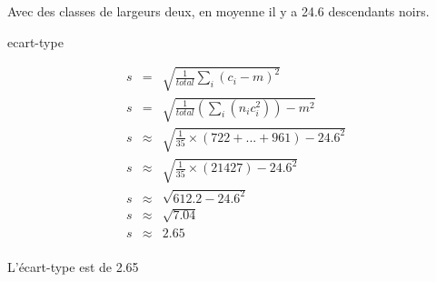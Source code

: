 \documentclass[11pt]{article}
\begin{document}
\begin{enumerate}
  Avec des classes de largeurs deux, en moyenne il y a 24.6 descendants noirs.

ecart-type

\begin{eqnarray*}
s &=& \sqrt { \frac {1}{total} \sum _i (c_i - m)^2} \\
s &=& \sqrt { \frac {1}{total} ( \sum _i (n_i c_i^2))  - m^2} \\
s & \approx & \sqrt { \frac {1}{35} \times (722 + ... + 961) - 24.6^2 } \\
s & \approx & \sqrt { \frac {1}{35} \times (21427) - 24.6^2 } \\
s & \approx & \sqrt { 612.2 - 24.6^2 } \\
s & \approx & \sqrt {7.04} \\
s & \approx & 2.65 \\
\end{eqnarray*}

L'écart-type est de 2.65




\end{enumerate}
\end{document}
